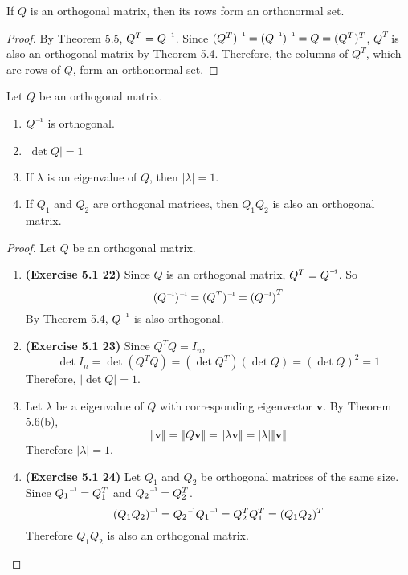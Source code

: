 \begin{theorem}
	If $Q$ is an orthogonal matrix, then its rows form an orthonormal set.
\end{theorem}
\begin{proof}
	By Theorem 5.5, $Q^T = \inv{Q}$. Since $\inv{(Q^T)} = \inv{(\inv{Q})} = Q = (Q^T)^T$, $Q^T$ is also an orthogonal matrix by Theorem 5.4. Therefore, the columns of $Q^T$, which are rows of $Q$, form an orthonormal set.
\end{proof}

\begin{theorem}
	Let $Q$ be an orthogonal matrix.
	\begin{enumerate}
		\item $\inv{Q}$ is orthogonal.
		\item $\vert \det{Q} \vert = 1$
		\item If $\lambda$ is an eigenvalue of $Q$, then $\vert \lambda \vert = 1$.
		\item If $Q_1$ and $Q_2$ are orthogonal \nbyn matrices, then $Q_1Q_2$ is also an orthogonal matrix.
	\end{enumerate}
\end{theorem}
\begin{proof}
	Let $Q$ be an orthogonal matrix.
	\begin{enumerate}
		\item \textbf{(Exercise 5.1 22)} Since $Q$ is an orthogonal matrix, $Q^T = \inv{Q}$. So \begin{equation*}
			\inv{(\inv{Q})} = \inv{(Q^T)} = {(\inv{Q})}^T
		\end{equation*}
		By Theorem 5.4, $\inv{Q}$ is also orthogonal.
		\item \textbf{(Exercise 5.1 23)} Since $Q^TQ = I_n$, \begin{equation*}
			\det{I_n} = \det{(Q^TQ)} = (\det{Q^T})(\det{Q}) = {(\det{Q})}^2 = 1
		\end{equation*}
		Therefore, $\vert \det{Q} \vert = 1$.
		\item Let $\lambda$ be a eigenvalue of $Q$ with corresponding eigenvector $\textbf{v}$. By Theorem 5.6(b), \begin{equation*}
			\Vert \textbf{v} \Vert = \Vert Q\textbf{v} \Vert = \Vert \lambda\textbf{v} \Vert = \vert \lambda \vert \Vert \textbf{v} \Vert
		\end{equation*}
		Therefore $\vert \lambda \vert = 1$.
		\item \textbf{(Exercise 5.1 24)} Let $Q_1$ and $Q_2$ be orthogonal matrices of the same size. Since $\inv{Q_1} = Q_1^T$ and $\inv{Q_2} = Q_2^T$. \begin{equation*}
			\inv{(Q_1Q_2)} = \inv{Q_2}\inv{Q_1} = Q_2^TQ_1^T = (Q_1Q_2)^T
		\end{equation*}
		Therefore $Q_1Q_2$ is also an orthogonal matrix.
	\end{enumerate}
\end{proof}

